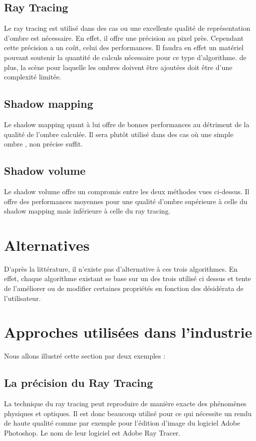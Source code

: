 \documentclass[a4paper,10pt]{report}
\begin{document}
\subsection{Ray Tracing}
Le ray tracing est utilisé dans des cas ou une excellente qualité de représentation d'ombre est nécessaire. En effet, il offre une précision au pixel près. Cependant cette précision a un coût, celui des performances. Il faudra en effet un matériel pouvant soutenir la quantité de calculs nécessaire pour ce type d'algorithme. de plus, la scène pour laquelle les ombres doivent être ajoutées doit être d'une complexité limitée.
\subsection{Shadow mapping}
Le shadow mapping quant à lui offre de bonnes performances au détriment de la qualité de l'ombre calculée. Il sera plutôt utilisé dans des cas où une simple ombre , non précise suffit.
\subsection{Shadow volume}
Le shadow volume offre un compromis entre les deux méthodes vues ci-dessus. Il offre des performances moyennes pour une qualité d'ombre supérieure à celle du shadow mapping mais inférieure à celle du ray tracing. 

\section{Alternatives}

D'après la littérature, il n'existe pas d'alternative à ces trois algorithmes. En effet, chaque algorithme existant se base sur un des trois utilisé ci dessus et tente de l'améliorer ou de modifier certaines propriétés en fonction des désidérata de l'utilisateur.

\section{Approches utilisées dans l'industrie}

Nous allons illustré cette section par deux exemples :

\subsection{La précision du Ray Tracing}

La technique du ray tracing peut reproduire de manière exacte des phénomènes physiques et optiques. Il est donc beaucoup utilisé pour ce qui nécessite un rendu de haute qualité comme par exemple pour l'édition d'image du logiciel Adobe Photoshop. Le nom de leur logiciel est Adobe Ray Tracer.
\end{document}
